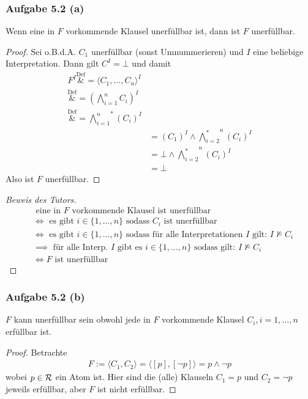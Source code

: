 \subsubsection{Aufgabe 5.2 (a)}
Wenn eine in $F$ vorkommende Klausel unerfüllbar ist, dann ist $F$ unerfüllbar.

\begin{proof}
	Sei o.B.d.A. $C_1$ unerfüllbar (sonst Umnummerieren) und $I$ eine beliebige Interpretation. 
	Dann gilt $C^I=\bot$ und damit
	\begin{align*}
		F^I
		\overset{\text{Def}}&=
		\langle C_1,\ldots,C_n\rangle^I\\
		\overset{\text{Def}}&=
		\left(\bigwedge\limits_{i=1}^n C_i\right)^I\\
		\overset{\text{Def}}&=
		\stackrel{\ast}{\bigwedge\limits_{i=1}^n} (C_i)^I\\
		&=(C_1)^I\wedge \stackrel{n}{\bigwedge\limits_{i=2}^\ast} (C_i)^I\\
		&=\bot\wedge \stackrel{n}{\bigwedge\limits_{i=2}^\ast} (C_i)^I\\
		&=\bot
	\end{align*}
	Also ist $F$ unerfüllbar.
\end{proof}

\begin{proof}[Beweis des Tutors]
	\begin{align*}
		&\text{ eine in $F$ vorkommende Klausel ist unerfüllbar}\\
		&\Longleftrightarrow\text{ es gibt $i\in\lbrace1,\ldots,n\rbrace$ sodass $C_i$ ist unerfüllbar}\\
		&\Longleftrightarrow\text{ es gibt $i\in\lbrace1,\ldots,n\rbrace$ sodass für alle Interpretationen $I$ gilt: }I\not\models C_i\\
		&\implies\text{ für alle Interp. $I$ gibt es $i\in\lbrace1,\ldots,n\rbrace$ sodass gilt: }I\not\models C_i\\
		&\Longleftrightarrow F\text{ ist unerfüllbar}
	\end{align*}
\end{proof}

\subsubsection{Aufgabe 5.2 (b)}
$F$ kann unerfüllbar sein obwohl jede in $F$ vorkommende Klausel $C_i,i=1,\ldots,n$ erfüllbar ist.

\begin{proof}
	Betrachte
	\begin{align*}
		F:=\langle C_1,C_2\rangle=\langle[p],[\neg p]\rangle=p\wedge\neg p
	\end{align*}
	wobei $p\in\mathcal{R}$ ein Atom ist. 
	Hier sind die (alle) Klauseln $C_1=p$ und $C_2=\neg p$  jeweils erfüllbar, aber $F$ ist nicht erfüllbar.
\end{proof}

